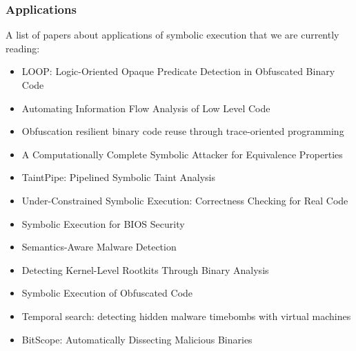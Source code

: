 \subsubsection{Applications}
A list of papers about applications of symbolic execution that we are currently reading:
\begin{itemize}
  \item \cite{LOOP-CCS15} LOOP: Logic-Oriented Opaque Predicate Detection in Obfuscated Binary Code
  \item \cite{BDG-CCS14} Automating Information Flow Analysis of Low Level Code
  \item \cite{ZFM-CCS13} Obfuscation resilient binary code reuse through trace-oriented programming
  \item \cite{BC-CCS14} A Computationally Complete Symbolic Attacker for Equivalence Properties
  \item \cite{MWX-USEC15} TaintPipe: Pipelined Symbolic Taint Analysis
  \item \cite{RE-USEC15} Under-Constrained Symbolic Execution: Correctness Checking for Real Code
  \item \cite{BLR-WOOT15} Symbolic Execution for {BIOS} Security
  \item \cite{CJS-SP05} Semantics-Aware Malware Detection
  \item \cite{KRV-ACSAC04} Detecting Kernel-Level Rootkits Through Binary Analysis
  \item \cite{YBD-CCS15} Symbolic Execution of Obfuscated Code
  \item \cite{CWO-ASPLOS06} Temporal search: detecting hidden malware timebombs with virtual machines
  \item \cite{BHK-TR07} BitScope: Automatically Dissecting Malicious Binaries
\end{itemize}

  

